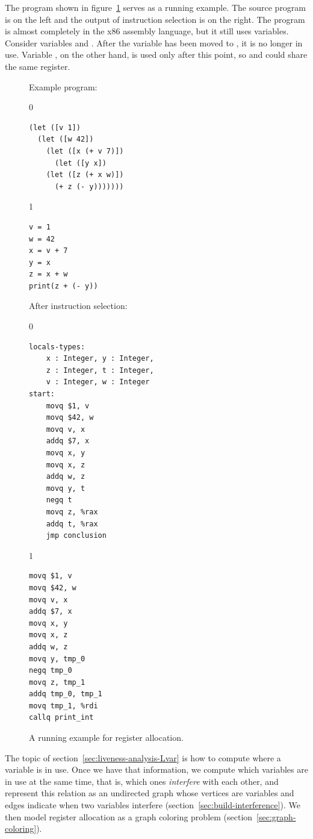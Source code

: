 \documentclass[7x10]{TimesAPriori_MIT}%
\def\racketEd{0}
\def\pythonEd{1}
\providecommand{\BookEdition}{1}
\let\edition\BookEdition
\newcommand{\pythonColor}[0]{}
\numberwithin{theorem}{chapter}
\numberwithin{definition}{chapter}
\numberwithin{equation}{chapter}
\begin{document}
The program shown in figure~\ref{fig:reg-eg} serves as a running
example. The source program is on the left and the output of
instruction selection
is on the right. The program is almost
completely in the x86 assembly language, but it still uses variables.
Consider variables  and .  After the variable 
has been moved to , it is no longer in use.  Variable , on
the other hand, is used only after this point, so  and
 could share the same register.

\begin{figure}
\begin{tcolorbox}[colback=white]
\begin{minipage}{0.45\textwidth}
Example \LangVar{} program:
{\if\edition\racketEd
\begin{lstlisting}
(let ([v 1])
  (let ([w 42])
    (let ([x (+ v 7)])
      (let ([y x])
	(let ([z (+ x w)])
	  (+ z (- y)))))))
\end{lstlisting}
\fi}
{\if\edition\pythonEd\pythonColor
\begin{lstlisting}
v = 1
w = 42
x = v + 7
y = x
z = x + w
print(z + (- y))
\end{lstlisting}
\fi}
\end{minipage}
\begin{minipage}{0.45\textwidth}
After instruction selection:
{\if\edition\racketEd
\begin{lstlisting}
locals-types:
    x : Integer, y : Integer,
    z : Integer, t : Integer,
    v : Integer, w : Integer
start:
    movq $1, v
    movq $42, w
    movq v, x
    addq $7, x
    movq x, y
    movq x, z
    addq w, z
    movq y, t
    negq t
    movq z, %rax
    addq t, %rax
    jmp conclusion
\end{lstlisting}
\fi}
{\if\edition\pythonEd\pythonColor
\begin{lstlisting}
movq $1, v
movq $42, w
movq v, x
addq $7, x
movq x, y
movq x, z
addq w, z
movq y, tmp_0
negq tmp_0
movq z, tmp_1
addq tmp_0, tmp_1
movq tmp_1, %rdi
callq print_int
\end{lstlisting}
\fi}
\end{minipage}
\end{tcolorbox}
\caption{A running example for register allocation.}
\label{fig:reg-eg}
\end{figure}

The topic of section~\ref{sec:liveness-analysis-Lvar} is how to
compute where a variable is in use.  Once we have that information, we
compute which variables are in use at the same time, that is, which ones
\emph{interfere} with each other, and
represent this relation as an undirected graph whose vertices are
variables and edges indicate when two variables interfere
(section~\ref{sec:build-interference}). We then model register
allocation as a graph coloring problem
(section~\ref{sec:graph-coloring}).
\end{document}
